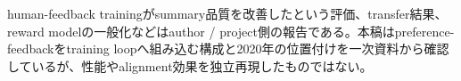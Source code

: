 \begin{claimboundary}
human-feedback trainingがsummary品質を改善したという評価、transfer結果、reward modelの一般化などはauthor / project側の報告である。本稿はpreference-feedbackをtraining loopへ組み込む構成と2020年の位置付けを一次資料から確認しているが、性能やalignment効果を独立再現したものではない。\autocite{src-8622fc1e22c2,src-e5838d162a66}
\end{claimboundary}
